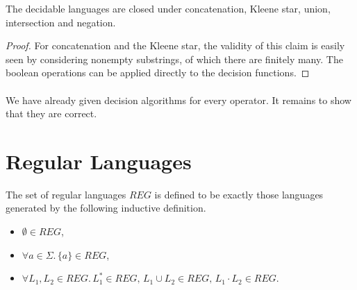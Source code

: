 
\vspace{-0.4cm}
\vspace{-0.4cm}
\vspace{-0.4cm}

\begin{theorem}{}
    \label{DecLangClosed}
    The decidable languages are closed under concatenation, Kleene star, union, intersection and negation. 
\end{theorem}
\begin{proof}
    For concatenation and the Kleene star, the validity of this claim is easily seen by considering nonempty substrings, of which there are finitely many. 
    The boolean operations can be applied directly to the decision functions.
\end{proof}

\paragraph{}
We have already given decision algorithms for every operator. 
It remains to show that they are correct.








\section{Regular Languages}


\begin{definition}{}
    \label{REG}
    The set of regular languages $REG$ is defined to be exactly those languages generated by the following inductive definition.
    \begin{itemize}
        \item
            $\emptyset \in REG$, 
        \item
            $\forall a \in \Sigma. \, \{a\} \in REG$, 
        \item
            $\forall L_1, L_2 \in REG. \, L_1^* \in REG, \, L_1 \cup L_2 \in REG, \, L_1 \cdot L_2 \in REG$.
    \end{itemize}
\end{definition}


